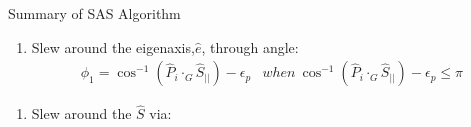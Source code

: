 \documentclass{beamer}
\begin{document}
%
%
\begin{frame}{Summary of SAS Algorithm}
\begin{block}{}
\begin{enumerate}[I]
\item Slew around the eigenaxis,$\hat{e}$, through angle:
\begin{equation}
	\begin{array}{lr}
	\phi_1 = \cos^{-1}(\hat{P}_i\cdot_G\hat{S}_{||})-\epsilon_p & {\scriptstyle when}\  \cos^{-1}(\hat{P}_i\cdot_G\hat{S}_{||})-\epsilon_p\leq \pi
	\end{array}
\end{equation}
\end{enumerate}
\begin{enumerate}[I]
\item Slew around the $\hat{S}$ via:


\end{enumerate}
\end{block}
\end{frame}
\end{document}
